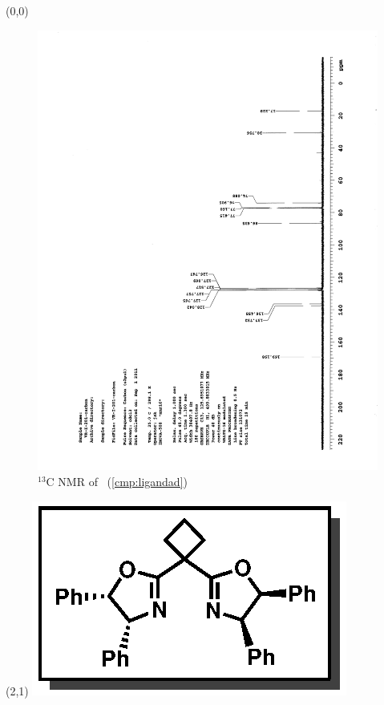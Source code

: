\clearpage
\begin{textblock}{20}(0,0)
\begin{figure}[htb]
\caption{$^{13}$C NMR of  \CMPligandad\ (\ref{cmp:ligandad})}
\includegraphics[scale=0.75, trim = 0mm 0mm 0mm 5mm,
clip]{chp_asymmetric/images/nmr/ligandadC}
\vspace{-100pt}
\end{figure}
\end{textblock}
\begin{textblock}{1}(2,1)
\includegraphics[scale=0.8, angle=90]{chp_asymmetric/images/ligandad}
\end{textblock}
\clearpage

